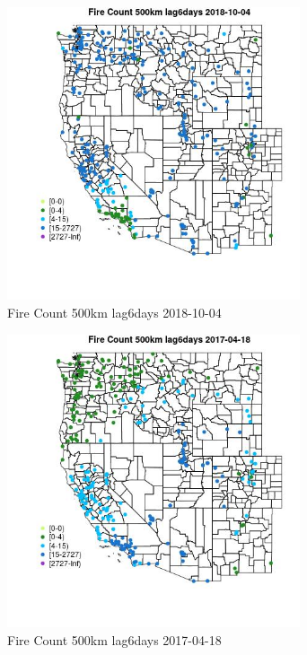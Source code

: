 \begin{figure} 
\centering  
\includegraphics[width=0.77\textwidth]{Code_Outputs/Report_ML_input_PM25_Step4_part_f_de_duplicated_aveswNAs_MapObsFire_Count_500km_lag6days2018-10-04.jpg} 
\caption{\label{fig:Report_ML_input_PM25_Step4_part_f_de_duplicated_aveswNAsMapObsFire_Count_500km_lag6days2018-10-04}Fire Count 500km lag6days 2018-10-04} 
\end{figure} 
 

\begin{figure} 
\centering  
\includegraphics[width=0.77\textwidth]{Code_Outputs/Report_ML_input_PM25_Step4_part_f_de_duplicated_aveswNAs_MapObsFire_Count_500km_lag6days2017-04-18.jpg} 
\caption{\label{fig:Report_ML_input_PM25_Step4_part_f_de_duplicated_aveswNAsMapObsFire_Count_500km_lag6days2017-04-18}Fire Count 500km lag6days 2017-04-18} 
\end{figure} 
 

